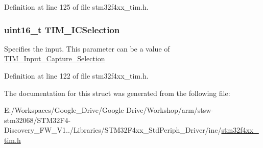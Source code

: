 Definition at line 125 of file stm32f4xx\-\_\-tim.\-h.

\hypertarget{struct_t_i_m___i_c_init_type_def_a052908740c8c618054ef82b3ec89e9b3}{
\subsubsection[{T\-I\-M\-\_\-\-I\-C\-Selection}]{\setlength{\rightskip}{0pt plus 5cm}uint16\-\_\-t T\-I\-M\-\_\-\-I\-C\-Selection}}\label{struct_t_i_m___i_c_init_type_def_a052908740c8c618054ef82b3ec89e9b3}
Specifies the input. This parameter can be a value of \hyperlink{group___t_i_m___input___capture___selection}{T\-I\-M\-\_\-\-Input\-\_\-\-Capture\-\_\-\-Selection} 

Definition at line 122 of file stm32f4xx\-\_\-tim.\-h.



The documentation for this struct was generated from the following file\-:\begin{DoxyCompactItemize}
\item 
E\-:/\-Workspaces/\-Google\-\_\-\-Drive/\-Google Drive/\-Workshop/arm/stsw-\/stm32068/\-S\-T\-M32\-F4-\/\-Discovery\-\_\-\-F\-W\-\_\-\-V1../\-Libraries/\-S\-T\-M32\-F4xx\-\_\-\-Std\-Periph\-\_\-\-Driver/inc/\hyperlink{stm32f4xx__tim_8h}{stm32f4xx\-\_\-tim.\-h}\end{DoxyCompactItemize}

